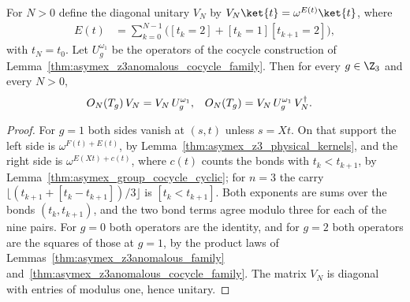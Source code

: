 \begin{lemma}
    \label{thm:asymex_z3anomalous_cocycle_bridge}
    \leanok
    For $N>0$ define the diagonal unitary $V_N$ by
    $V_N\ket{t}=\omega^{E(t)}\ket{t}$, where
    \begin{align}
        E(t)
         & =\sum_{k=0}^{N-1}\bigl([t_k=2]+[t_k=1][t_{k+1}=2]\bigr),
        \label{eq:asymex_z3anomalous_bridge_exponent}
    \end{align}
    with $t_N=t_0$. Let $U^{\omega_1}_g$ be the operators of the cocycle
    construction of Lemma~\ref{thm:asymex_z3anomalous_cocycle_family}.
    Then for every $g\in\Z_3$ and every $N>0$,
    \begin{align}
        O_N(T_g)\,V_N
         & =V_N\,U^{\omega_1}_g,
         &
        O_N(T_g)
         & =V_N\,U^{\omega_1}_g\,V_N^\dagger.
        \notag
    \end{align}
\end{lemma}

\begin{proof}
    \leanok
    For $g=1$ both sides vanish at $(s,t)$ unless $s=Xt$. On that support
    the left side is $\omega^{F(t)+E(t)}$, by
    Lemma~\ref{thm:asymex_z3_physical_kernels}, and the right side is
    $\omega^{E(Xt)+c(t)}$, where $c(t)$ counts the bonds with
    $t_k<t_{k+1}$, by Lemma~\ref{thm:asymex_group_cocycle_cyclic}; for
    $n=3$ the carry $\lfloor(t_{k+1}+[t_k-t_{k+1}])/3\rfloor$ is
    $[t_k<t_{k+1}]$. Both exponents are sums over the bonds $(t_k,t_{k+1})$,
    and the two bond terms agree modulo three for each of the nine pairs.
    For $g=0$ both operators are the identity, and for $g=2$ both
    operators are the squares of those at $g=1$, by the product laws of
    Lemmas~\ref{thm:asymex_z3anomalous_family}
    and~\ref{thm:asymex_z3anomalous_cocycle_family}. The matrix $V_N$ is
    diagonal with entries of modulus one, hence unitary.
\end{proof}

